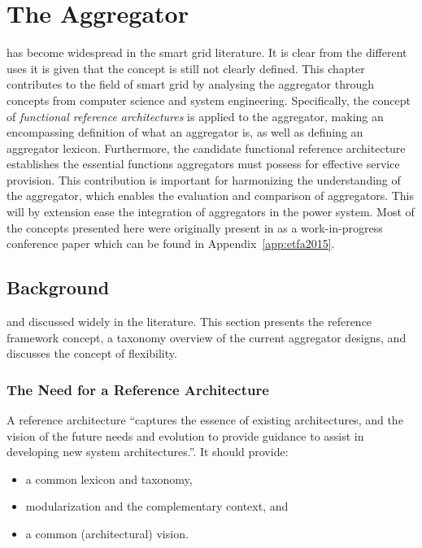 \chapter{The Aggregator} %
\label{cha:aggregator}%
 has become widespread in the smart grid literature. It is clear from the different uses it is given that the concept is still not clearly defined. This chapter contributes to the field of smart grid by analysing the aggregator through concepts from computer science and system engineering. Specifically, the concept of \emph{functional reference architectures} is applied to the aggregator, making an encompassing definition of what an aggregator is, as well as defining an aggregator lexicon. Furthermore, the candidate functional reference architecture establishes the essential functions aggregators must possess for effective service provision. This contribution is important for harmonizing the understanding of the aggregator, which enables the evaluation and comparison of aggregators. This will by extension ease the integration of aggregators in the power system. Most of the concepts presented here were originally present in as a work-in-progress conference paper which can be found in Appendix~\ref{app:etfa2015}. 

\section{Background}
 and discussed widely in the literature. This section presents the reference framework concept, a taxonomy overview of the current aggregator designs, and discusses the concept of flexibility. 
\subsection{The Need for a Reference Architecture} %
\label{sub:ReferenceArchitecture}
A reference architecture ``captures the essence of existing architectures, and the vision of the future needs and evolution to provide guidance to assist in developing new system architectures.''. It should provide: 
\begin{itemize}
\item a common lexicon and taxonomy,
\item modularization and the complementary context, and
\item a common (architectural) vision.
\end{itemize} 

